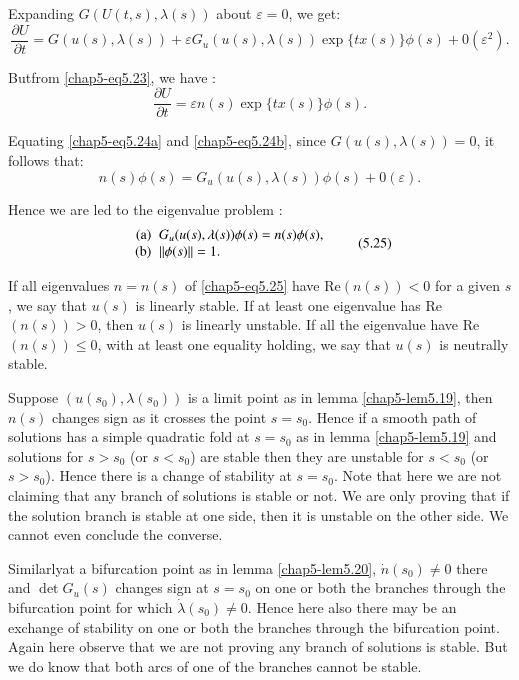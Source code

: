 Expanding $G(U(t,s), \lambda(s))$ about $\varepsilon = 0$, we get: 
\begin{equation*}
\frac{\partial U}{\partial t} = G(u(s), \lambda(s)) +
\varepsilon G_{u}(u(s), \lambda(s)) \exp \{tx(s)\} \phi (s) +
0(\varepsilon^{2}). \tag{5.24a}\label{chap5-eq5.24a}
\end{equation*}

But\pageoriginale from \eqref{chap5-eq5.23}, we have :
\begin{equation*}
\frac{\partial U}{\partial t} = \varepsilon n(s) \exp \{tx(s)\} \phi
(s). \tag{5.24b}\label{chap5-eq5.24b}
\end{equation*}

Equating \eqref{chap5-eq5.24a} and \eqref{chap5-eq5.24b}, since
$G(u(s), \lambda(s)) = 0$, it 
follows that: 
$$
n (s) \phi (s) = G_{u}(u(s), \lambda(s)) \phi (s) + 0(\varepsilon).
$$

Hence we are led to the eigenvalue problem :
\begin{equation*}
\begin{array}{r@{\;\;}l}
\text{(a)} & G_{u}(u(s), \lambda (s)) \phi (s) = n (s) \phi (s),\\
\text{(b)} & \| \phi (s) \| = 1. 
\end{array}\tag{5.25}\label{chap5-eq5.25}
\end{equation*}

If all eigenvalues $n = n(s)$ of \eqref{chap5-eq5.25} have Re$(n(s))< 0$ for a
given $s$, we say that $u(s)$ is linearly stable. If at least one
eigenvalue has Re$(n(s)) > 0$, then $u(s)$ is linearly unstable. If
all the eigenvalue have Re$(n(s)) \le 0$, with at least one equality
holding, we say that $u(s)$ is neutrally stable. 

Suppose $(u(s_{0}), \lambda (s_{0}))$ is a limit point as in lemma
\ref{chap5-lem5.19}, then $n(s)$ changes sign as it crosses the point $s =
s_{0}$. Hence if a smooth path of solutions has a simple quadratic
fold at $s = s_{0}$ as in lemma \ref{chap5-lem5.19} 
and solutions for $s > s_{0}$
(or $s < s_{0}$) are stable then they are unstable for $s < s_{0}$ (or
$s > s_{0}$). Hence there is a change of stability at $s =
s_{0}$. Note that here we are not claiming that any branch of
solutions is stable or not. We are only proving that if the solution
branch is stable at one side, then it is unstable on the other
side. We cannot even conclude the converse.   

Similarly\pageoriginale at a bifurcation point as in lemma
\ref{chap5-lem5.20}, $\dot{n}(s_{0}) 
\neq 0$ there and $\det G_{u}(s)$ changes sign at $s = s_{0}$ on one
or both the branches through the bifurcation point for which
$\dot{\lambda} (s_{0}) \neq 0$. Hence here also there may be an
exchange of stability on one or both the branches through the
bifurcation point. Again here observe that we are not proving any
branch of solutions is stable. But we do know that both arcs of one of
the branches cannot be stable.  

